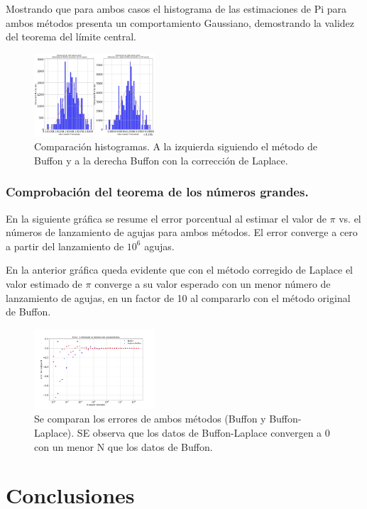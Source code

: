 \documentclass{rbf}
\begin{document}
Mostrando que para ambos casos el histograma de las estimaciones de Pi para ambos métodos presenta un comportamiento Gaussiano, demostrando la validez del teorema del límite central.
\begin{figure}[h]
 \centering
  \includegraphics[width=0.4\textwidth]{figures/lap.jpg}
	\caption{Comparación histogramas. A la izquierda siguiendo el método de Buffon y a la derecha Buffon con la corrección de Laplace. }
 \label{buff10}
\end{figure}
\subsubsection{Comprobación del teorema de los números grandes.}
En la siguiente gráfica se resume el error porcentual al estimar el valor de $\pi$ vs. el números de lanzamiento de agujas para ambos métodos. El error converge a cero a partir del lanzamiento de $10^6$ agujas.

En la anterior gráfica queda evidente que con el método corregido de Laplace el valor estimado de $\pi$ converge a su valor esperado con un menor número de lanzamiento de agujas, en un factor de 10 al compararlo con el método original de Buffon. 
\begin{figure}[h]
 \centering
  \includegraphics[width=0.4\textwidth]{figures/err.jpg}
	\caption{Se comparan los errores de ambos métodos (Buffon y Buffon-Laplace). SE observa que los datos de Buffon-Laplace convergen a 0 con un menor N que los datos de Buffon.}
 \label{buff11}
\end{figure}

\section{Conclusiones}
\end{document}
